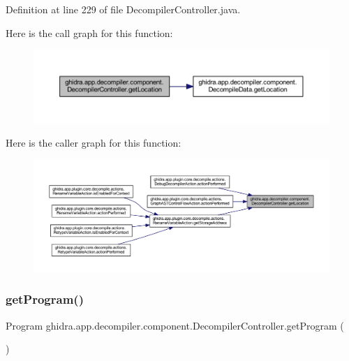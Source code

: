Definition at line 229 of file Decompiler\+Controller.\+java.

Here is the call graph for this function\+:
\nopagebreak
\begin{figure}[H]
\begin{center}
\leavevmode
\includegraphics[width=350pt]{classghidra_1_1app_1_1decompiler_1_1component_1_1_decompiler_controller_a80c1e9eb44608b4b7d04a513e29feb24_cgraph}
\end{center}
\end{figure}
Here is the caller graph for this function\+:
\nopagebreak
\begin{figure}[H]
\begin{center}
\leavevmode
\includegraphics[width=350pt]{classghidra_1_1app_1_1decompiler_1_1component_1_1_decompiler_controller_a80c1e9eb44608b4b7d04a513e29feb24_icgraph}
\end{center}
\end{figure}
\mbox{\label{classghidra_1_1app_1_1decompiler_1_1component_1_1_decompiler_controller_a8ac46f8ce844a53344fc6ccf60f0eee4}} 
\subsubsection{\texorpdfstring{getProgram()}{getProgram()}}
{\footnotesize\ttfamily Program ghidra.\+app.\+decompiler.\+component.\+Decompiler\+Controller.\+get\+Program (\begin{DoxyParamCaption}{ }\end{DoxyParamCaption})\hspace{0.3cm}{\ttfamily [inline]}}




